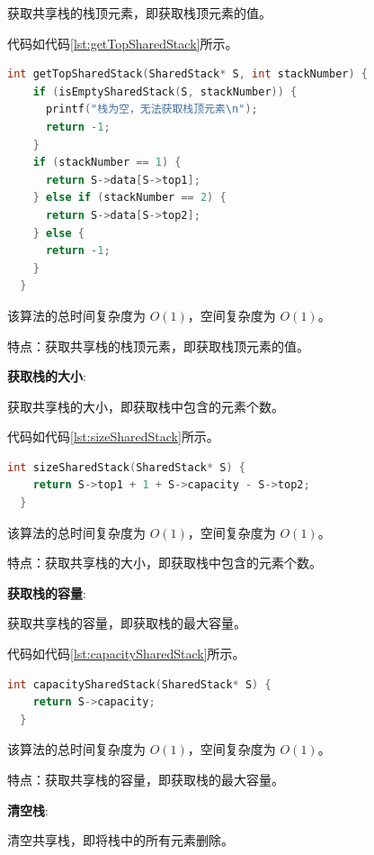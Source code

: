 \documentclass[lang=cn,newtx,10pt,scheme=chinese]{elegantbook}
\begin{document}
获取共享栈的栈顶元素，即获取栈顶元素的值。

代码如代码\ref{lst:getTopSharedStack}所示。

\begin{lstlisting}[language=C++, caption={获取共享栈的栈顶元素示例代码}, label={lst:getTopSharedStack}]
  int getTopSharedStack(SharedStack* S, int stackNumber) {
    if (isEmptySharedStack(S, stackNumber)) {
      printf("栈为空，无法获取栈顶元素\n");
      return -1;
    }
    if (stackNumber == 1) {
      return S->data[S->top1];
    } else if (stackNumber == 2) {
      return S->data[S->top2];
    } else {
      return -1;
    }
  }

\end{lstlisting}

该算法的总时间复杂度为 $O(1)$，空间复杂度为 $O(1)$。

特点：获取共享栈的栈顶元素，即获取栈顶元素的值。

\textbf{获取栈的大小}:

获取共享栈的大小，即获取栈中包含的元素个数。

代码如代码\ref{lst:sizeSharedStack}所示。

\begin{lstlisting}[language=C++, caption={获取共享栈的大小示例代码}, label={lst:sizeSharedStack}]
  int sizeSharedStack(SharedStack* S) {
    return S->top1 + 1 + S->capacity - S->top2;
  }

\end{lstlisting}

该算法的总时间复杂度为 $O(1)$，空间复杂度为 $O(1)$。

特点：获取共享栈的大小，即获取栈中包含的元素个数。

\textbf{获取栈的容量}:

获取共享栈的容量，即获取栈的最大容量。

代码如代码\ref{lst:capacitySharedStack}所示。

\begin{lstlisting}[language=C++, caption={获取共享栈的容量示例代码}, label={lst:capacitySharedStack}]
  int capacitySharedStack(SharedStack* S) {
    return S->capacity;
  }

\end{lstlisting}

该算法的总时间复杂度为 $O(1)$，空间复杂度为 $O(1)$。

特点：获取共享栈的容量，即获取栈的最大容量。

\textbf{清空栈}:

清空共享栈，即将栈中的所有元素删除。
\end{document}

